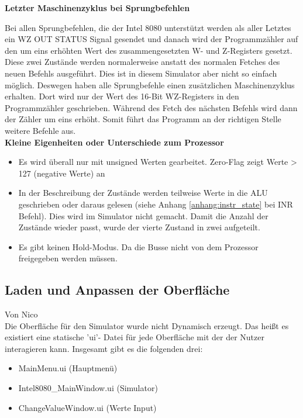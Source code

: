 \documentclass[12pt]{article}
\newcommand{\imgSpaceBefore}{\vspace{10pt}}
\begin{document}
\noindent
\textbf{Letzter Maschinenzyklus bei Sprungbefehlen}

\noindent
Bei allen Sprungbefehlen, die der Intel 8080 unterstützt werden als aller Letztes ein WZ OUT STATUS Signal gesendet und danach wird der Programmzähler auf den um eins erhöhten Wert des zusammengesetzten W- und Z-Registers gesetzt. Diese zwei Zustände werden normalerweise anstatt des normalen Fetches des neuen Befehls ausgeführt. Dies ist in diesem Simulator aber nicht so einfach möglich. Deswegen haben alle Sprungbefehle einen zusätzlichen Maschinenzyklus erhalten. Dort wird nur der Wert des 16-Bit WZ-Registers in den Programmzähler geschrieben. Während des Fetch des nächsten Befehls wird dann der Zähler um eins erhöht. Somit führt das Programm an der richtigen Stelle weitere Befehle aus.
\\

\noindent
\textbf{Kleine Eigenheiten oder Unterschiede zum Prozessor}

\noindent
\begin{itemize}
\item Es wird überall nur mit unsigned Werten gearbeitet. Zero-Flag zeigt Werte > 127 (negative Werte) an
\item In der Beschreibung der Zustände werden teilweise Werte in die ALU geschrieben oder daraus gelesen (siehe Anhang \ref{anhang:instr_state} bei INR Befehl). Dies wird im Simulator nicht gemacht. Damit die Anzahl der Zustände wieder passt, wurde der vierte Zustand in zwei aufgeteilt.
\item Es gibt keinen Hold-Modus. Da die Busse nicht von dem Prozessor freigegeben werden müssen.
\end{itemize}

\subsection{Laden und Anpassen der Oberfläche}\label{chapter:LadenDObfl}
Von Nico\\
\noindent
Die Oberfläche für den Simulator wurde nicht Dynamisch erzeugt. Das heißt es existiert eine statische 'ui'- Datei für jede Oberfläche mit der der Nutzer interagieren kann. Insgesamt gibt es die folgenden drei:\imgSpaceBefore

\begin{itemize}
	\item MainMenu.ui (Hauptmenü)
	\item Intel8080\_MainWindow.ui (Simulator)
	\item ChangeValueWindow.ui (Werte Input)
\end{itemize}
\end{document}
